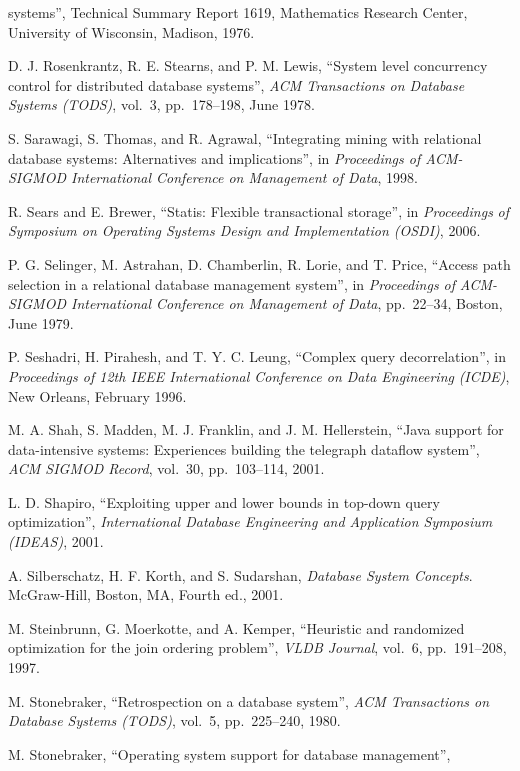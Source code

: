 \documentclass[b5paper,11pt,twoside,openright]{book}
\begin{document}
\begin{enumerate}[label={[\arabic*]}]
  systems'', Technical Summary Report 1619, Mathematics Research Center,
  University of Wisconsin, Madison, 1976.
\item
  D. J. Rosenkrantz, R. E. Stearns, and P. M. Lewis, ``System level
  concurrency control for distributed database systems'', \emph{ACM
  Transactions on Database Systems (TODS)}, vol.~3, pp.~178--198, June
  1978.
\item
  S. Sarawagi, S. Thomas, and R. Agrawal, ``Integrating mining with
  relational database systems: Alternatives and implications'', in
  \emph{Proceedings of ACM-SIGMOD International Conference on Management
  of Data}, 1998.
\item
  R. Sears and E. Brewer, ``Statis: Flexible transactional storage'', in
  \emph{Proceedings} \emph{of Symposium on Operating Systems Design and
  Implementation (OSDI)}, 2006.
\item
  P. G. Selinger, M. Astrahan, D. Chamberlin, R. Lorie, and T. Price,
  ``Access path selection in a relational database management system'',
  in \emph{Proceedings of} \emph{ACM-SIGMOD International Conference on
  Management of Data}, pp.~22--34, Boston, June 1979.
\item
  P. Seshadri, H. Pirahesh, and T. Y. C. Leung, ``Complex query
  decorrelation'', in \emph{Proceedings of 12th IEEE International
  Conference on Data Engineering} \emph{(ICDE)}, New Orleans, February
  1996.
\item
  M. A. Shah, S. Madden, M. J. Franklin, and J. M. Hellerstein, ``Java
  support for data-intensive systems: Experiences building the telegraph
  dataflow system'', \emph{ACM SIGMOD Record}, vol.~30, pp.~103--114,
  2001.
\item
  L. D. Shapiro, ``Exploiting upper and lower bounds in top-down query
  optimization'', \emph{International Database Engineering and
  Application Symposium} \emph{(IDEAS)}, 2001.
\item
  A. Silberschatz, H. F. Korth, and S. Sudarshan, \emph{Database System
  Concepts}. McGraw-Hill, Boston, MA, Fourth ed., 2001.
\item
  M. Steinbrunn, G. Moerkotte, and A. Kemper, ``Heuristic and randomized
  optimization for the join ordering problem'', \emph{VLDB Journal},
  vol.~6, pp.~191--208, 1997.
\item
  M. Stonebraker, ``Retrospection on a database system'', \emph{ACM
  Transactions on} \emph{Database Systems (TODS)}, vol.~5, pp.~225--240,
  1980.
\item
  M. Stonebraker, ``Operating system support for database management'',

\end{enumerate}
\end{document}
